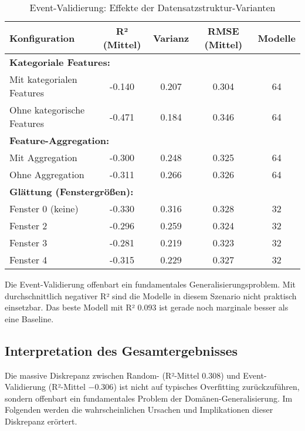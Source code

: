 \begin{table}[H]
  \centering
  \begin{tabular}{lcccc}
    \toprule
    \textbf{Konfiguration} & \textbf{R² (Mittel)} & \textbf{Varianz} & \textbf{RMSE (Mittel)} & \textbf{Modelle} \\
    \midrule
    \multicolumn{5}{l}{\textbf{Kategoriale Features:}} \\
    Mit kategorialen Features & -0.140 & 0.207 & 0.304 & 64 \\
    Ohne kategorische Features & -0.471 & 0.184 & 0.346 & 64 \\
    \midrule
    \multicolumn{5}{l}{\textbf{Feature-Aggregation:}} \\
    Mit Aggregation & -0.300 & 0.248 & 0.325 & 64 \\
    Ohne Aggregation & -0.311 & 0.266 & 0.326 & 64 \\
    \midrule
    \multicolumn{5}{l}{\textbf{Glättung (Fenstergrößen):}} \\
    Fenster 0 (keine) & -0.330 & 0.316 & 0.328 & 32 \\
    Fenster 2 & -0.296 & 0.259 & 0.324 & 32 \\
    Fenster 3 & -0.281 & 0.219 & 0.323 & 32 \\
    Fenster 4 & -0.315 & 0.229 & 0.327 & 32 \\
    \bottomrule
  \end{tabular}
  \caption{Event-Validierung: Effekte der Datensatzstruktur-Varianten}
  \label{tab:structure_event}
\end{table}

Die Event-Validierung offenbart ein fundamentales Generalisierungsproblem. Mit durchschnittlich negativer R² sind die Modelle in diesem Szenario nicht praktisch einsetzbar. Das beste Modell mit R² $0.093$ ist gerade noch marginale besser als eine Baseline.

\subsection{Interpretation des Gesamtergebnisses}

Die massive Diskrepanz zwischen Random- (R²-Mittel $0.308$) und Event-Validierung (R²-Mittel $-0.306$) ist nicht auf typisches Overfitting zurückzuführen, sondern offenbart ein fundamentales Problem der Domänen-Generalisierung. Im Folgenden werden die wahrscheinlichen Ursachen und Implikationen dieser Diskrepanz erörtert.

